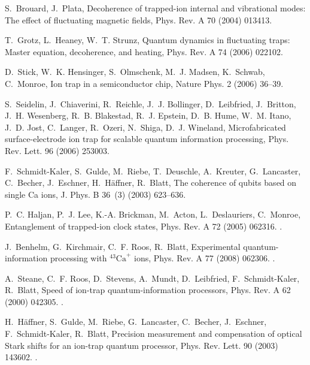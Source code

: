 \documentclass[3p,sort&compress]{elsarticle}
\begin{document}
\begin{thebibliography}{100}
S.~Brouard, J.~Plata, Decoherence of trapped-ion internal and vibrational
  modes: {T}he effect of fluctuating magnetic fields, Phys. Rev. A 70 (2004)
  013413.

T.~Grotz, L.~Heaney, W.~T. Strunz, Quantum dynamics in fluctuating traps:
  {M}aster equation, decoherence, and heating, Phys. Rev. A 74 (2006) 022102.

D.~Stick, W.~K. Hensinger, S.~Olmschenk, M.~J. Madsen, K.~Schwab, C.~Monroe,
  Ion trap in a semiconductor chip, Nature Phys. 2 (2006) 36--39.

S.~Seidelin, J.~Chiaverini, R.~Reichle, J.~J. Bollinger, D.~Leibfried,
  J.~Britton, J.~H. Wesenberg, R.~B. Blakestad, R.~J. Epstein, D.~B. Hume,
  W.~M. Itano, J.~D. Jost, C.~Langer, R.~Ozeri, N.~Shiga, D.~J. Wineland,
  Microfabricated surface-electrode ion trap for scalable quantum information
  processing, Phys. Rev. Lett. 96 (2006) 253003.

F.~Schmidt-Kaler, S.~Gulde, M.~Riebe, T.~Deuschle, A.~Kreuter, G.~Lancaster,
  C.~Becher, J.~Eschner, H.~H{\"a}ffner, R.~Blatt, The coherence of qubits
  based on single {Ca} ions, J. Phys. B 36~(3) (2003) 623--636.

P.~C. Haljan, P.~J. Lee, K.-A. Brickman, M.~Acton, L.~Deslauriers, C.~Monroe,
  Entanglement of trapped-ion clock states, Phys. Rev. A 72 (2005) 062316.
\newblock \href {http://dx.doi.org/10.1103/PhysRevA.72.062316}
  {}.

J.~Benhelm, G.~Kirchmair, C.~F. Roos, R.~Blatt, Experimental
  quantum-information processing with ${^{43}\text{C}\text{a}}^{+}$ ions, Phys.
  Rev. A 77 (2008) 062306.
\newblock \href {http://dx.doi.org/10.1103/PhysRevA.77.062306}
  {}.

A.~Steane, C.~F. Roos, D.~Stevens, A.~Mundt, D.~Leibfried, F.~Schmidt-Kaler,
  R.~Blatt, Speed of ion-trap quantum-information processors, Phys. Rev. A 62
  (2000) 042305.
\newblock \href {http://dx.doi.org/10.1103/PhysRevA.62.042305}
  {}.

H.~H\"affner, S.~Gulde, M.~Riebe, G.~Lancaster, C.~Becher, J.~Eschner,
  F.~Schmidt-Kaler, R.~Blatt, Precision measurement and compensation of optical
  {S}tark shifts for an ion-trap quantum processor, Phys. Rev. Lett. 90 (2003)
  143602.
\newblock \href {http://dx.doi.org/10.1103/PhysRevLett.90.143602}
  {}.


\end{thebibliography}
\end{document}
